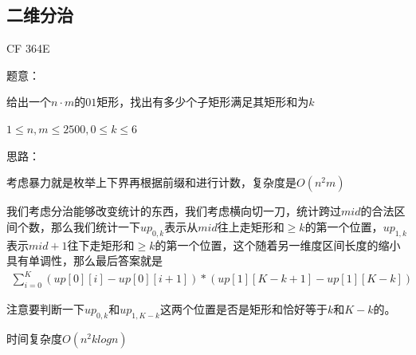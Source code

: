 \subsection{二维分治}

CF 364E\par
题意：\par
给出一个$n \cdot m$的$01$矩形，找出有多少个子矩形满足其矩形和为$k$\par
$1 \leq n, m \leq 2500, 0 \leq k \leq 6$\par
思路：\par
考虑暴力就是枚举上下界再根据前缀和进行计数，复杂度是$O(n^2m)$\par
我们考虑分治能够改变统计的东西，我们考虑横向切一刀，统计跨过$mid$的合法区间个数，那么我们统计一下$up_{0, k}$表示从$mid$往上走矩形和$\geq k$的第一个位置，$up_{1, k}$表示$mid + 1$往下走矩形和$\geq k$的第一个位置，这个随着另一维度区间长度的缩小具有单调性，那么最后答案就是
\begin{eqnarray*}
\sum\limits_{i = 0}^K (up[0][i] - up[0][i + 1]) * (up[1][K - k + 1] - up[1][K - k])
\end{eqnarray*} \par
注意要判断一下$up_{0, k}$和$up_{1, K - k}$这两个位置是否是矩形和恰好等于$k$和$K - k$的。\par
时间复杂度$O(n^2klogn)$

